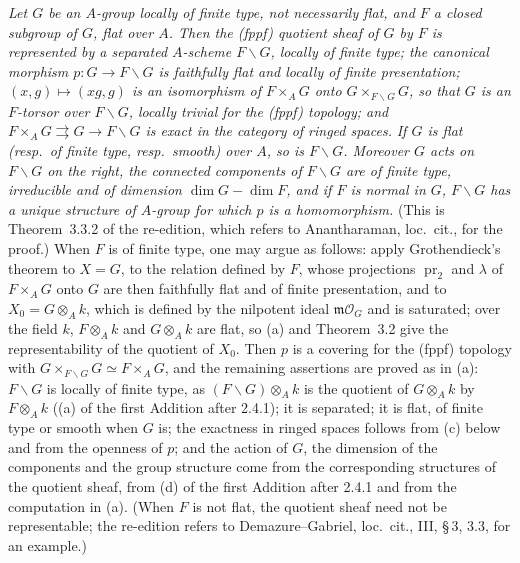 \label{thm:sga3-VIA-3.3.2}%
\emph{Let \(G\) be an \(A\)-group locally of finite type, not necessarily flat, and \(F\) a closed
subgroup of \(G\), flat over \(A\). Then the (fppf) quotient sheaf of \(G\) by \(F\) is represented
by a separated \(A\)-scheme \(F\backslash G\), locally of finite type; the canonical morphism
\(p\colon G\to F\backslash G\) is faithfully flat and locally of finite presentation;
\((x,g)\mapsto(xg,g)\) is an isomorphism of \(F\times_AG\) onto \(G\times_{F\backslash G}G\), so that
\(G\) is an \(F\)-torsor over \(F\backslash G\), locally trivial for the (fppf) topology; and
\(F\times_AG\rightrightarrows G\to F\backslash G\) is exact in the category of ringed spaces.}
\label{thm:sga3-VIA-3.3.2:item:iii}%
\emph{If \(G\) is flat \textup{(}resp.\ of finite type, resp.\ smooth\textup{)} over \(A\), so is
\(F\backslash G\). Moreover \(G\) acts on \(F\backslash G\) on the right, the connected components of
\(F\backslash G\) are of finite type, irreducible and of dimension \(\dim G-\dim F\), and if \(F\) is
normal in \(G\), \(F\backslash G\) has a unique structure of \(A\)-group for which \(p\) is a
homomorphism.} (This is Theorem~3.3.2 of the re-edition, which refers to Anantharaman, loc.\ cit.,
for the proof.) When \(F\) is of finite type, one may argue as follows: apply Grothendieck's theorem
to \(X=G\), to the relation defined by \(F\), whose projections \(\operatorname{pr}_2\) and \(\lambda\)
of \(F\times_AG\) onto \(G\) are then faithfully flat and of finite presentation, and to
\(X_0=G\otimes_Ak\), which is defined by the nilpotent ideal \(\mathfrak m\mathcal O_G\) and is saturated;
over the field \(k\), \(F\otimes_Ak\) and \(G\otimes_Ak\) are flat, so (a) and Theorem~3.2 give the
representability of the quotient of \(X_0\). Then \(p\) is a covering for the (fppf) topology with
\(G\times_{F\backslash G}G\simeq F\times_AG\), and the remaining assertions are proved as in (a):
\(F\backslash G\) is locally of finite type, as \((F\backslash G)\otimes_Ak\) is the quotient of
\(G\otimes_Ak\) by \(F\otimes_Ak\) ((a) of the first Addition after 2.4.1); it is separated; it is flat,
of finite type or smooth when \(G\) is; the exactness in ringed spaces follows from (c) below and from
the openness of \(p\); and the action of \(G\), the dimension of the components and the group
structure come from the corresponding structures of the quotient sheaf, from (d) of the first
Addition after 2.4.1 and from the computation in (a). (When \(F\) is not flat, the quotient sheaf need
not be representable; the re-edition refers to Demazure--Gabriel, loc.\ cit., III, \S\,3, 3.3, for an
example.)

